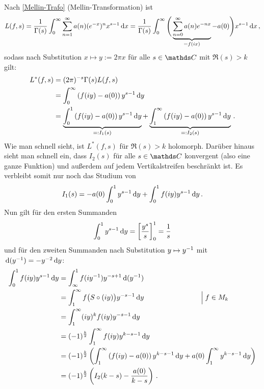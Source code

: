 \begin{bewe}
Nach \autoref{Mellin-Trafo} (Mellin-Transformation) ist
\[
	L(f,s) 
	= \frac 1{\Gamma(s)} \int_0^\infty \sum_{n=1}^\infty a(n) (e^{-x})^n x^{s-1} \,\mathrm{d} x
	= \frac 1{\Gamma(s)} \int_0^\infty \Bigg( \underbrace{\sum_{n=0}^\infty a(n) e^{-nx}}_{= f(ix)} - a(0) \Bigg) x^{s-1} \,\mathrm{d} x
	\,,
\]
sodass nach Substitution $x \mapsto y := 2\pi x$ für alle $s \in \CC$ mit $\Re(s) > k$ gilt:
\begin{align*}
	L^*(f,s) 
	&= (2\pi)^{-s} \Gamma(s) L(f,s) \\
	&= \int_0^\infty \left( f(iy) - a(0) \right) y^{s-1} \,\mathrm{d} y \\
	&= \underbrace{\int_0^1 \left( f(iy) - a(0) \right) y^{s-1} \,\mathrm{d} y}_{=: I_1(s)} + \underbrace{\int_1^\infty \left( f(iy) - a(0) \right) y^{s-1} \,\mathrm{d} y}_{=: I_2(s)}
	\,.
\end{align*}
Wie man schnell sieht, ist $L^*(f,s)$ für $\Re(s) > k$ holomorph. Darüber hinaus sieht man schnell ein, dass $I_2(s)$ für alle $s \in \CC$ konvergent (also eine ganze Funktion) und außerdem auf jedem Vertikalstreifen beschränkt ist. Es verbleibt somit nur noch das Studium von
\[
	I_1(s) = - a(0) \int_0^1 y^{s-1} \,\mathrm{d} y + \int_0^1 f(iy) y^{s-1} \,\mathrm{d} y
	\,.
\]
Nun gilt für den ersten Summanden
\[
	\int_0^1 y^{s-1} \,\mathrm{d} y = \left[ \frac {y^s}s \right]_0^1 = \frac 1s
\]
und für den zweiten Summanden nach Substitution $y \mapsto y^{-1}$ mit $\,\mathrm{d} (y^{-1}) = -y^{-2} \,\mathrm{d} y$:
\begin{align*}
	\int_0^1 f(iy) y^{s-1} \,\mathrm{d} y
	&= \int_\infty^1 f(i y^{-1}) y^{-s+1} \,\mathrm{d} (y^{-1}) \\
	&= \int_1^\infty f \big( S \circ (iy) \big) y^{-s-1} \,\mathrm{d} y \qquad \qquad \qquad \qquad \Big| \; f \in M_k \\
	&= \int_1^\infty (iy)^k f(iy) y^{-s-1} \,\mathrm{d} y \\
	&= (-1)^{\frac k2} \int_1^\infty f(iy) y^{k-s-1} \,\mathrm{d} y \\
	&= (-1)^{\frac k2} \left( \int_1^\infty \left( f(iy) - a(0) \right) y^{k-s-1} \,\mathrm{d} y + a(0) \int_1^\infty y^{k-s-1} \,\mathrm{d} y \right) \\
	&= (-1)^{\frac k2} \left( I_2(k-s) - \frac {a(0)}{k-s} \right)
	\,.
\end{align*}


\end{bewe}
